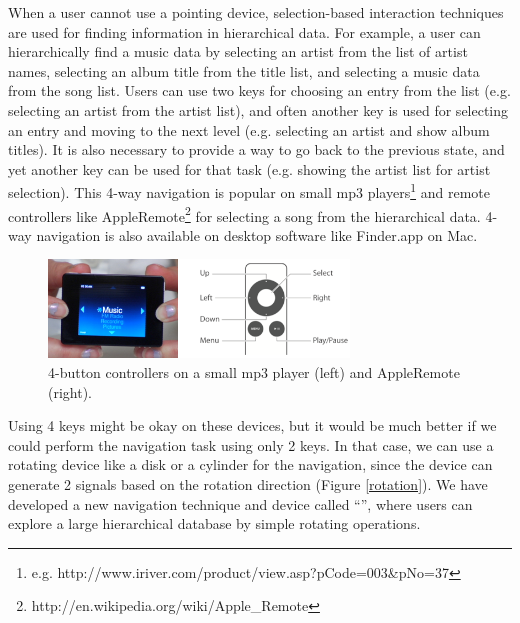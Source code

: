\documentclass{article}
\begin{document}
When a user cannot use a pointing device,
selection-based interaction techniques are used for
finding information in hierarchical data.
For example, a user can hierarchically find a music data by
selecting an artist from the list of artist names,
selecting an album title from the title list,
and selecting a music data from the song list.
Users can use two keys for choosing an entry from the list
(e.g. selecting an artist from the artist list),
and often another key is used for selecting an entry and moving to the next level
(e.g. selecting an artist and show album titles).
It is also necessary to provide a way to go back to the previous state, and
yet another key can be used for that task
(e.g. showing the artist list for artist selection).
%
This 4-way navigation is popular on small mp3 players\footnote{
  e.g. \textsf{http://www.iriver.com/product/view.asp?pCode=003\&pNo=37}
} and remote controllers like AppleRemote\footnote{\textsf{http://en.wikipedia.org/wiki/Apple\_Remote}}
for selecting a song from the hierarchical data.
4-way navigation is also available on desktop software like Finder.app on Mac.

\begin{figure}[H]
\centerline{\includegraphics[width=80mm,bb=0 0 547 179]{figures/4buttons.png}}
\caption{4-button controllers on a small mp3 player (left) and AppleRemote (right).}
\label{u10}
\end{figure}



Using 4 keys might be okay on these devices, but it would be much better
if we could perform the navigation task using only 2 keys.
In that case, we can use a rotating device like a disk or a cylinder for the navigation,
since the device can generate 2 signals based on the rotation direction (Figure \ref{rotation}).
%
%
We have developed a new navigation technique and device called ``{\ST}'',
where users can explore a large hierarchical database by simple rotating operations.
\end{document}
